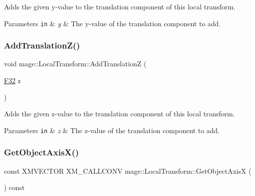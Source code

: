 Adds the given y-\/value to the translation component of this local transform.


\begin{DoxyParams}[1]{Parameters}
\mbox{\tt in}  & {\em y} & The y-\/value of the translation component to add. \\
\hline
\end{DoxyParams}
\hypertarget{classmage_1_1_local_transform_aa2f35831d30101a57d1bfaf1cba527b8}{}\label{classmage_1_1_local_transform_aa2f35831d30101a57d1bfaf1cba527b8} 
\subsubsection{\texorpdfstring{Add\+Translation\+Z()}{AddTranslationZ()}}
{\footnotesize\ttfamily void mage\+::\+Local\+Transform\+::\+Add\+TranslationZ (\begin{DoxyParamCaption}\item[{\hyperlink{namespacemage_aa97e833b45f06d60a0a9c4fc22ae02c0}{F32}}]{z }\end{DoxyParamCaption})\hspace{0.3cm}{\ttfamily [noexcept]}}

Adds the given z-\/value to the translation component of this local transform.


\begin{DoxyParams}[1]{Parameters}
\mbox{\tt in}  & {\em z} & The z-\/value of the translation component to add. \\
\hline
\end{DoxyParams}
\hypertarget{classmage_1_1_local_transform_a369350f17dbf41afa8278643bb641125}{}\label{classmage_1_1_local_transform_a369350f17dbf41afa8278643bb641125} 
\subsubsection{\texorpdfstring{Get\+Object\+Axis\+X()}{GetObjectAxisX()}}
{\footnotesize\ttfamily const X\+M\+V\+E\+C\+T\+OR X\+M\+\_\+\+C\+A\+L\+L\+C\+O\+NV mage\+::\+Local\+Transform\+::\+Get\+Object\+AxisX (\begin{DoxyParamCaption}{ }\end{DoxyParamCaption}) const\hspace{0.3cm}{\ttfamily [noexcept]}}

